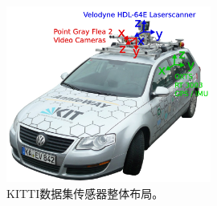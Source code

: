 \begin{figure}[h]
	\centering
	\includegraphics[width=0.6\textwidth]{./imgs/KITTI.png}
	\caption{KITTI数据集传感器整体布局。}
	\label{fig:KITTI}
\end{figure}